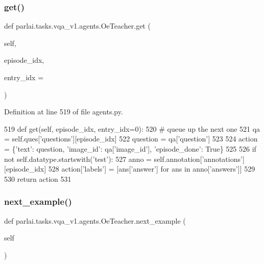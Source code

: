 \subsubsection{\texorpdfstring{get()}{get()}}
{\footnotesize\ttfamily def parlai.\+tasks.\+vqa\+\_\+v1.\+agents.\+Oe\+Teacher.\+get (\begin{DoxyParamCaption}\item[{}]{self,  }\item[{}]{episode\+\_\+idx,  }\item[{}]{entry\+\_\+idx = {} }\end{DoxyParamCaption})}



Definition at line 519 of file agents.\+py.


\begin{DoxyCode}
519     \textcolor{keyword}{def }get(self, episode\_idx, entry\_idx=0):
520         \textcolor{comment}{# queue up the next one}
521         qa = self.ques[\textcolor{stringliteral}{'questions'}][episode\_idx]
522         question = qa[\textcolor{stringliteral}{'question'}]
523 
524         action = \{\textcolor{stringliteral}{'text'}: question, \textcolor{stringliteral}{'image\_id'}: qa[\textcolor{stringliteral}{'image\_id'}], \textcolor{stringliteral}{'episode\_done'}: \textcolor{keyword}{True}\}
525 
526         \textcolor{keywordflow}{if} \textcolor{keywordflow}{not} self.datatype.startswith(\textcolor{stringliteral}{'test'}):
527             anno = self.annotation[\textcolor{stringliteral}{'annotations'}][episode\_idx]
528             action[\textcolor{stringliteral}{'labels'}] = [ans[\textcolor{stringliteral}{'answer'}] \textcolor{keywordflow}{for} ans \textcolor{keywordflow}{in} anno[\textcolor{stringliteral}{'answers'}]]
529 
530         \textcolor{keywordflow}{return} action
531 
\end{DoxyCode}
\mbox{\label{classparlai_1_1tasks_1_1vqa__v1_1_1agents_1_1OeTeacher_a42df8da64edbf22fcc976b1cd02ef252}} 
\subsubsection{\texorpdfstring{next\+\_\+example()}{next\_example()}}
{\footnotesize\ttfamily def parlai.\+tasks.\+vqa\+\_\+v1.\+agents.\+Oe\+Teacher.\+next\+\_\+example (\begin{DoxyParamCaption}\item[{}]{self }\end{DoxyParamCaption})}

